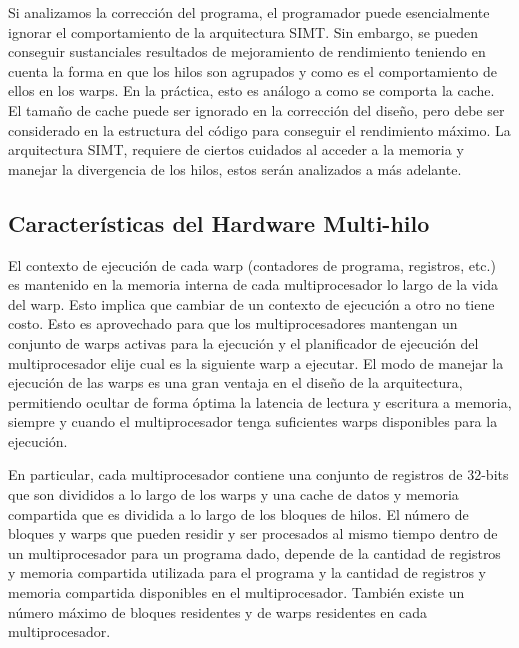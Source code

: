 \documentclass[a4paper,openright,12pt, oneside]{book}
\begin{document}
Si analizamos la correcci\'on del programa, el programador puede esencialmente
ignorar el comportamiento de la arquitectura SIMT. Sin embargo, se pueden conseguir
sustanciales resultados de mejoramiento de rendimiento teniendo en cuenta la forma
en que los hilos son agrupados y como es el comportamiento de ellos en los warps.
En la pr\'actica, esto es an\'alogo a como se comporta la cache. El tama\~no de cache
puede ser ignorado en la correcci\'on del dise\~no, pero debe ser considerado en la
estructura del c\'odigo para conseguir el rendimiento m\'aximo. La arquitectura SIMT,
requiere de ciertos cuidados al acceder a la memoria y manejar la divergencia
de los hilos, estos ser\'an analizados a m\'as adelante.

\subsection{Caracter\'isticas del Hardware Multi-hilo}

El contexto de ejecuci\'on de cada warp (contadores de programa, registros, etc.) es mantenido
en la memoria interna de cada multiprocesador lo largo de la vida del warp. Esto implica que cambiar
de un contexto de ejecuci\'on a otro no tiene costo. Esto es aprovechado para
que los multiprocesadores mantengan un conjunto de warps activas para la ejecuci\'on
y el planificador de ejecuci\'on del multiprocesador elije cual es la
siguiente warp a ejecutar. El modo de manejar la ejecuci\'on de las warps es una 
gran ventaja en el dise\~no de la arquitectura, permitiendo ocultar de forma 
\'optima la latencia de lectura y escritura a memoria, siempre y cuando el 
multiprocesador tenga suficientes warps disponibles para la ejecuci\'on.

En particular, cada multiprocesador contiene una conjunto de registros de 32-bits
que son divididos a lo largo de los warps y una cache de datos y memoria compartida
que es dividida a lo largo de los bloques de hilos. El n\'umero de bloques y warps 
que pueden residir y ser procesados al mismo tiempo dentro de un multiprocesador 
para un programa dado, depende de la cantidad de
registros y memoria compartida utilizada para el programa y la cantidad
de registros y memoria compartida disponibles en el multiprocesador. Tambi\'en
existe un n\'umero m\'aximo de bloques residentes y de warps residentes en cada
multiprocesador.
\end{document}

